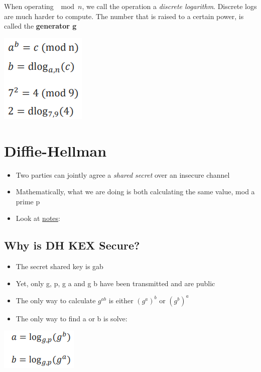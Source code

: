 \documentclass{article}
\begin{document}
\begin{flushleft}
When operating $\mod n$, we call the operation a \textit{discrete logarithm}. Discrete logs are much harder to compute. The number that is raised to a certain power, is called the \textbf{generator g}
\end{flushleft}

\begin{center}
  \includegraphics[scale=0.5]{dlog.png}
\end{center}

\section{Diffie-Hellman}
\begin{itemize}
  \item Two parties can jointly agree a \textit{shared secret} over an insecure channel 
  \item Mathematically, what we are doing is both calculating the same value, mod a prime p
  \item Look at \href{https://moodle.nottingham.ac.uk/pluginfile.php/5121129/mod_resource/content/0/L5%20-%20Cryptography%20III%202pp.pdf}{notes}:
\end{itemize}

\subsection{Why is DH KEX Secure?}
\begin{itemize}
  \item The secret shared key is gab 
  \item Yet, only g, p, g a and g b have been transmitted and are public 
  \item The only way to calculate $g^{ab}$ is either $(g^a)^b$ or $(g^b)^a$ 
  \item The only way to find a or b is solve:
\end{itemize}

\begin{center}
  \includegraphics[scale=0.5]{solver.png}
\end{center}
\end{document}
